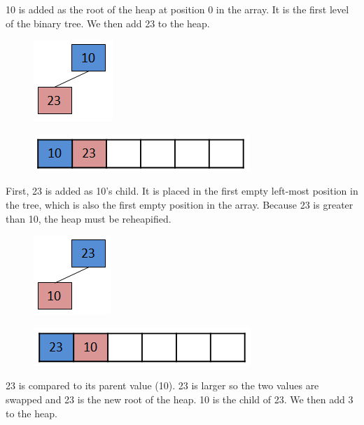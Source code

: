 10 is added as the root of the heap at position 0 in the array.   It is the first level of the binary tree.  
We then add 23 to the heap.

\begin{figure}[H]
\centering
\includegraphics{pictures/heap2.png}
\label{fig:heap2}
\end{figure}

\begin{figure}[H]
\centering
\includegraphics{pictures/heap2a.png}
\label{fig:heap2a}
\end{figure}

First, 23 is added as 10's child.  It is placed in the first empty left-most position in the tree, which is also the first empty position in the array.
Because 23 is greater than 10,  the heap must be reheapified.  

\begin{figure}[H]
\centering
\includegraphics{pictures/heap3.png}
\label{fig:heap3}
\end{figure}

\begin{figure}[H]
\centering
\includegraphics{pictures/heap3a.png}
\label{fig:heap3a}
\end{figure}

23 is compared to its parent value (10).  23 is larger so the two values are swapped and 23 is the new root of the heap.  10 is the child of 23.   We then add 3 to the heap.   

